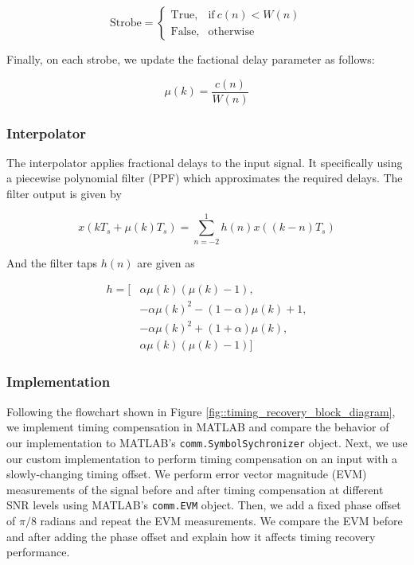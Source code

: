\documentclass{article}
\begin{document}
\begin{equation}
	\text{Strobe} = \begin{cases}
		\text{True}, & \text{if}\ c(n) < W(n)\\
		\text{False}, & \text{otherwise}
	\end{cases}
\end{equation}

\noindent Finally, on each strobe, we update the factional delay parameter as follows:

\begin{equation}
	\mu(k) = \frac{c(n)}{W(n)}
\end{equation}

\subsubsection{Interpolator}

The interpolator applies fractional delays to the input signal. It specifically using a piecewise polynomial filter (PPF) which approximates the required delays. The filter output is given by

\begin{equation}
	x(kT_s + \mu(k)T_s) = \sum_{n=-2}^{1}{h(n)x((k-n)T_s)}
\end{equation}

\noindent And the filter taps $h(n)$ are given as

\begin{equation}
\begin{split}
	h = [&\alpha\mu(k)(\mu(k) - 1), \\
	&-\alpha\mu(k)^2 - (1-\alpha)\mu(k) + 1,\\
	&-\alpha\mu(k)^2 + (1+\alpha)\mu(k),\\
	&\alpha\mu(k)(\mu(k) - 1)]
\end{split}
\end{equation}

\subsubsection{Implementation}

Following the flowchart shown in Figure \ref{fig::timing_recovery_block_diagram}, we implement timing compensation in MATLAB and compare the behavior of our implementation to MATLAB's \texttt{comm.SymbolSychronizer} object. Next, we use our custom implementation to perform timing compensation on an input with a slowly-changing timing offset. We perform error vector magnitude (EVM) measurements of the signal before and after timing compensation at different SNR levels using MATLAB's \texttt{comm.EVM} object. Then, we add a fixed phase offset of $\pi/8$ radians and repeat the EVM measurements. We compare the EVM before and after adding the phase offset and explain how it affects timing recovery performance.
\end{document}
